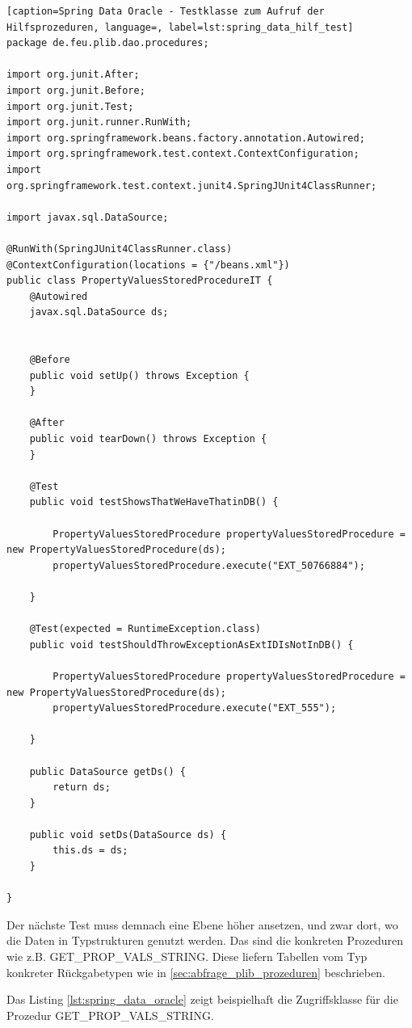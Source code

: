 \begin{lstlisting}[caption=Spring Data Oracle - Testklasse zum Aufruf der Hilfsprozeduren, language=, label=lst:spring_data_hilf_test]
package de.feu.plib.dao.procedures;

import org.junit.After;
import org.junit.Before;
import org.junit.Test;
import org.junit.runner.RunWith;
import org.springframework.beans.factory.annotation.Autowired;
import org.springframework.test.context.ContextConfiguration;
import org.springframework.test.context.junit4.SpringJUnit4ClassRunner;

import javax.sql.DataSource;

@RunWith(SpringJUnit4ClassRunner.class)
@ContextConfiguration(locations = {"/beans.xml"})
public class PropertyValuesStoredProcedureIT {
    @Autowired
    javax.sql.DataSource ds;


    @Before
    public void setUp() throws Exception {
    }

    @After
    public void tearDown() throws Exception {
    }

    @Test
    public void testShowsThatWeHaveThatinDB() {

        PropertyValuesStoredProcedure propertyValuesStoredProcedure = new PropertyValuesStoredProcedure(ds);
        propertyValuesStoredProcedure.execute("EXT_50766884");

    }

    @Test(expected = RuntimeException.class)
    public void testShouldThrowExceptionAsExtIDIsNotInDB() {

        PropertyValuesStoredProcedure propertyValuesStoredProcedure = new PropertyValuesStoredProcedure(ds);
        propertyValuesStoredProcedure.execute("EXT_555");

    }

    public DataSource getDs() {
        return ds;
    }

    public void setDs(DataSource ds) {
        this.ds = ds;
    }

}

\end{lstlisting}

Der nächste Test muss demnach eine Ebene höher ansetzen, und zwar dort, wo die Daten in Typstrukturen genutzt werden. Das sind die konkreten Prozeduren wie z.B. GET\_PROP\_VALS\_STRING. Diese liefern Tabellen vom Typ konkreter Rückgabetypen wie in \autoref{sec:abfrage_plib_prozeduren} beschrieben. 

Das Listing \autoref{lst:spring_data_oracle} zeigt beispielhaft die Zugriffsklasse für die Prozedur GET\_PROP\_VALS\_STRING.

